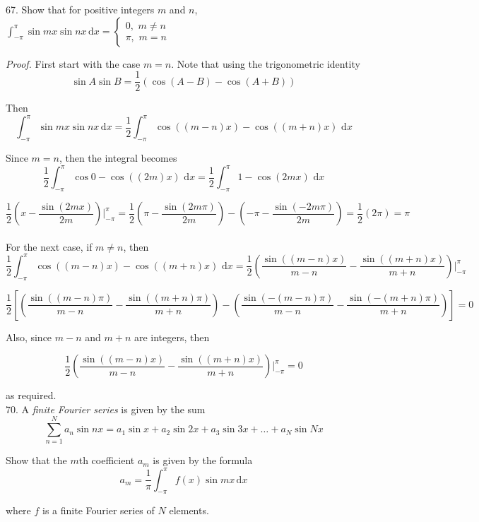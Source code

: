 \documentclass[12pt,a4paper]{article}
\begin{document}
67. Show that for positive integers $m$ and $n$, $\displaystyle \int_{-\pi}^{\pi} \sin{mx} \sin{nx} \, \mathrm{d}x =
\begin{cases}

0, \,\, m \neq n \\
\pi, \,\, m = n
\end{cases}$

\emph{Proof.} First start with the case $m = n$. Note that using the trigonometric identity $$\sin{A}\sin{B} = \frac{1}{2}(\cos{(A-B)} - \cos{(A+B)})$$

Then 
\[
\displaystyle \int_{-\pi}^{\pi} \sin{mx} \sin{nx} \, \mathrm{d}x = \frac{1}{2}\displaystyle \int_{-\pi}^{\pi} \cos{((m-n)x)} - \cos{((m+n)x)} \,\, \mathrm{d}x
\]

Since $m = n$, then the integral becomes
\[
\frac{1}{2}\displaystyle \int_{-\pi}^{\pi} \cos{0} - \cos{((2m)x)} \,\, \mathrm{d}x = \frac{1}{2}\displaystyle \int_{-\pi}^{\pi} 1 - \cos{(2mx)} \,\, \mathrm{d}x
\]

\[
\frac{1}{2} \left(x - \frac{\sin{(2mx)}}{2m}\right) \bigg\rvert_{-\pi}^{\pi} = \frac{1}{2} \left(\pi - \frac{\sin(2m\pi)}{2m} \right) - \left(-\pi - \frac{\sin(-2m\pi)}{2m} \right) = \frac{1}{2} (2\pi) = \pi
\]
\\
For the next case, if $m \neq n$, then
\[
\frac{1}{2}\displaystyle \int_{-\pi}^{\pi} \cos{((m-n)x)} - \cos{((m+n)x)} \,\, \mathrm{d}x = \frac{1}{2}\left(\frac{\sin{((m-n)x)}}{m-n} - \frac{\sin{((m+n)x)}}{m+n}\right) \bigg\rvert_{-\pi}^{\pi}
\]

\[
\frac{1}{2}\left[\left(\frac{\sin{((m-n)\pi)}}{m-n} - \frac{\sin{((m+n)\pi)}}{m+n}\right) - \left(\frac{\sin{(-(m-n)\pi)}}{m-n} - \frac{\sin{(-(m+n)\pi)}}{m+n}\right)\right] = 0
\]

Also, since $m - n$ and $m + n$ are integers, then 

\[
 \frac{1}{2}\left(\frac{\sin{((m-n)x)}}{m-n} - \frac{\sin{((m+n)x)}}{m+n}\right) \bigg\rvert_{-\pi}^{\pi} = 0
\]

as required.
\\

70. A \emph{finite Fourier series} is given by the sum
\[
\displaystyle  \sum_{n = 1}^{N} a_{n} \sin{nx} = a_1 \sin{x} + a_2 \sin{2x} + a_3 \sin{3x} + \ldots + a_N \sin{Nx}
\]

Show that the $m$th coefficient $a_m$ is given by the formula
$$ a_m = \frac{1}{\pi}\displaystyle \int_{-\pi}^{\pi} f(x)\sin{mx} \,\mathrm{d}x$$

where $f$ is a finite Fourier series of $N$ elements.\\
\end{document}
